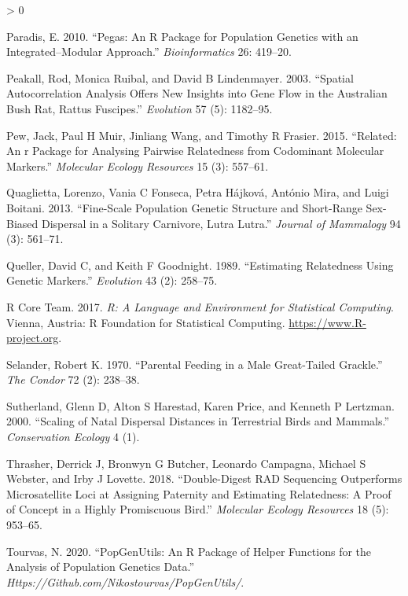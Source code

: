 \documentclass[
]{article}
\newlength{\cslhangindent}
\newenvironment{CSLReferences}[2] %
 {%
  \setlength{\parindent}{0pt}
  \ifodd #1 \everypar{\setlength{\hangindent}{\cslhangindent}}\ignorespaces\fi
  \ifnum #2 > 0
  \setlength{\parskip}{#2\baselineskip}
  \fi
 }%
 {}
\begin{document}
\begin{CSLReferences}{1}{0}
\leavevmode\hypertarget{ref-Paradis2010pegas}{}%
Paradis, E. 2010. {``Pegas: An {R} Package for Population Genetics with
an Integrated--Modular Approach.''} \emph{Bioinformatics} 26: 419--20.

\leavevmode\hypertarget{ref-peakall2003spatial}{}%
Peakall, Rod, Monica Ruibal, and David B Lindenmayer. 2003. {``Spatial
Autocorrelation Analysis Offers New Insights into Gene Flow in the
Australian Bush Rat, Rattus Fuscipes.''} \emph{Evolution} 57 (5):
1182--95.

\leavevmode\hypertarget{ref-pew2015related}{}%
Pew, Jack, Paul H Muir, Jinliang Wang, and Timothy R Frasier. 2015.
{``Related: An r Package for Analysing Pairwise Relatedness from
Codominant Molecular Markers.''} \emph{Molecular Ecology Resources} 15
(3): 557--61.

\leavevmode\hypertarget{ref-quaglietta2013fine}{}%
Quaglietta, Lorenzo, Vania C Fonseca, Petra Hájková, António Mira, and
Luigi Boitani. 2013. {``Fine-Scale Population Genetic Structure and
Short-Range Sex-Biased Dispersal in a Solitary Carnivore, Lutra
Lutra.''} \emph{Journal of Mammalogy} 94 (3): 561--71.

\leavevmode\hypertarget{ref-queller1989estimating}{}%
Queller, David C, and Keith F Goodnight. 1989. {``Estimating Relatedness
Using Genetic Markers.''} \emph{Evolution} 43 (2): 258--75.

\leavevmode\hypertarget{ref-rcoreteam}{}%
R Core Team. 2017. \emph{R: A Language and Environment for Statistical
Computing}. Vienna, Austria: R Foundation for Statistical Computing.
\url{https://www.R-project.org}.

\leavevmode\hypertarget{ref-selander1970parental}{}%
Selander, Robert K. 1970. {``Parental Feeding in a Male Great-Tailed
Grackle.''} \emph{The Condor} 72 (2): 238--38.

\leavevmode\hypertarget{ref-sutherland2000scaling}{}%
Sutherland, Glenn D, Alton S Harestad, Karen Price, and Kenneth P
Lertzman. 2000. {``Scaling of Natal Dispersal Distances in Terrestrial
Birds and Mammals.''} \emph{Conservation Ecology} 4 (1).

\leavevmode\hypertarget{ref-thrasher2018double}{}%
Thrasher, Derrick J, Bronwyn G Butcher, Leonardo Campagna, Michael S
Webster, and Irby J Lovette. 2018. {``Double-Digest RAD Sequencing
Outperforms Microsatellite Loci at Assigning Paternity and Estimating
Relatedness: A Proof of Concept in a Highly Promiscuous Bird.''}
\emph{Molecular Ecology Resources} 18 (5): 953--65.

\leavevmode\hypertarget{ref-Tourvas2020popgenutils}{}%
Tourvas, N. 2020. {``PopGenUtils: An {R} Package of Helper Functions for
the Analysis of Population Genetics Data.''}
\emph{Https://Github.com/Nikostourvas/PopGenUtils/}.


\end{CSLReferences}
\end{document}
